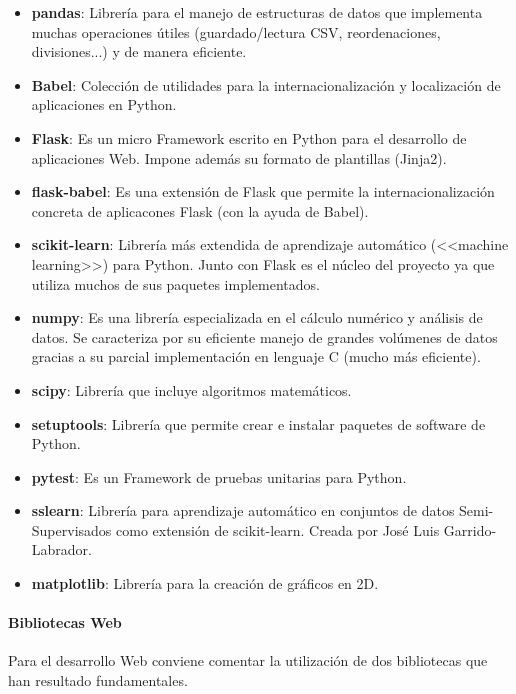 \begin{itemize}
	\item \textbf{pandas}: Librería para el manejo de estructuras de datos que implementa
	muchas operaciones útiles (guardado/lectura CSV, reordenaciones,
	divisiones...) y de manera eficiente.
	\item \textbf{Babel}: Colección de utilidades para la internacionalización y
	localización de aplicaciones en Python.
	\item \textbf{Flask}: Es un micro Framework escrito en Python para el desarrollo de
	aplicaciones Web. Impone además su formato de plantillas (Jinja2).
	\item \textbf{flask-babel}: Es una extensión de Flask que permite la
	internacionalización concreta de aplicacones Flask (con la ayuda de Babel).
	\item \textbf{scikit-learn}: Librería más extendida de aprendizaje automático
	(<<machine learning>>) para Python. Junto con Flask es el núcleo del
	proyecto ya que utiliza muchos de sus paquetes implementados.
	\item \textbf{numpy}: Es una librería especializada en el cálculo numérico y análisis
	de datos. Se caracteriza por su eficiente manejo de grandes volúmenes de
	datos gracias a su parcial implementación en lenguaje C (mucho más
	eficiente).
	\item \textbf{scipy}: Librería que incluye algoritmos matemáticos.
	\item \textbf{setuptools}: Librería que permite crear e instalar paquetes de
	software de Python.
	\item \textbf{pytest}: Es un Framework de pruebas unitarias para Python.
	\item \textbf{sslearn}: Librería para aprendizaje automático en conjuntos de datos
	Semi-Supervisados como extensión de scikit-learn. Creada por José Luis Garrido-Labrador.
	\item \textbf{matplotlib}: Librería para la creación de gráficos en 2D.
\end{itemize}

\paragraph{Bibliotecas Web} Para el desarrollo Web conviene comentar la
utilización de dos bibliotecas que han resultado fundamentales.

